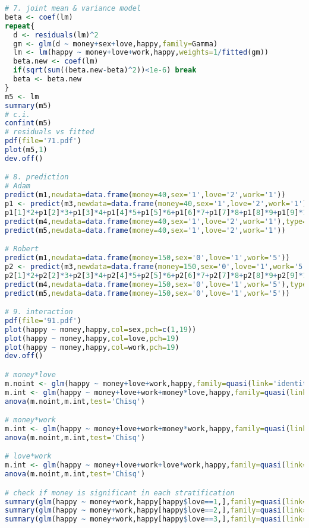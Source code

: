 \documentclass[11pt,letterpaper]{article}
\begin{document}
{\begin{lstlisting}[language=R]
# 7. joint mean & variance model
beta <- coef(lm)
repeat{
  d <- residuals(lm)^2
  gm <- glm(d ~ money+sex+love,happy,family=Gamma)
  lm <- lm(happy ~ money+love+work,happy,weights=1/fitted(gm))
  beta.new <- coef(lm)
  if(sqrt(sum((beta.new-beta)^2))<1e-6) break
  beta <- beta.new
}
m5 <- lm
summary(m5)
# c.i.
confint(m5)
# residuals vs fitted
pdf(file='71.pdf')
plot(m5,1)
dev.off()

# 8. prediction
# Adam
predict(m1,newdata=data.frame(money=40,sex='1',love='2',work='1'))
p1 <- predict(m3,newdata=data.frame(money=40,sex='1',love='2',work='1'),type='prob')
p1[1]*2+p1[2]*3+p1[3]*4+p1[4]*5+p1[5]*6+p1[6]*7+p1[7]*8+p1[8]*9+p1[9]*10
predict(m4,newdata=data.frame(money=40,sex='1',love='2',work='1'),type='response')
predict(m5,newdata=data.frame(money=40,sex='1',love='2',work='1'))

# Robert
predict(m1,newdata=data.frame(money=150,sex='0',love='1',work='5'))
p2 <- predict(m3,newdata=data.frame(money=150,sex='0',love='1',work='5'),type='prob')
p2[1]*2+p2[2]*3+p2[3]*4+p2[4]*5+p2[5]*6+p2[6]*7+p2[7]*8+p2[8]*9+p2[9]*10
predict(m4,newdata=data.frame(money=150,sex='0',love='1',work='5'),type='response')
predict(m5,newdata=data.frame(money=150,sex='0',love='1',work='5'))

# 9. interaction
pdf(file='91.pdf')
plot(happy ~ money,happy,col=sex,pch=c(1,19))
plot(happy ~ money,happy,col=love,pch=19)
plot(happy ~ money,happy,col=work,pch=19)
dev.off()

# money*love
m.noint <- glm(happy ~ money+love+work,happy,family=quasi(link='identity',variance='constant'))
m.int <- glm(happy ~ money+love+work+money*love,happy,family=quasi(link='identity',variance='constant'))
anova(m.noint,m.int,test='Chisq')

# money*work
m.int <- glm(happy ~ money+love+work+money*work,happy,family=quasi(link='identity',variance='constant'))
anova(m.noint,m.int,test='Chisq')

# love*work
m.int <- glm(happy ~ money+love+work+love*work,happy,family=quasi(link='identity',variance='constant'))
anova(m.noint,m.int,test='Chisq')

# check if money is significant in each stratification
summary(glm(happy ~ money+work,happy[happy$love==1,],family=quasi(link='identity',variance='constant')))
summary(glm(happy ~ money+work,happy[happy$love==2,],family=quasi(link='identity',variance='constant')))
summary(glm(happy ~ money+work,happy[happy$love==3,],family=quasi(link='identity',variance='constant')))
\end{lstlisting}}
\end{document}

